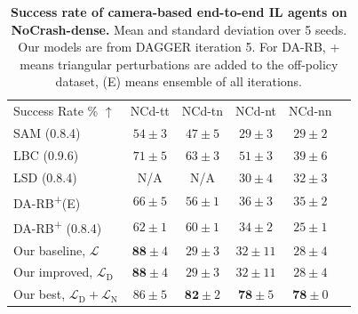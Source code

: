 \begin{table}
	\setlength{\tabcolsep}{2.67pt}
	\centering
	\begin{tabular}{lccccc}
		\toprule
		Success Rate \% $\uparrow$
		&  NCd-tt & NCd-tn  & NCd-nt & NCd-nn  \\ 
		\cmidrule(lr){1-1}\cmidrule(lr){2-5}
		SAM \cite{zhao2021sam} (0.8.4) & 
		$54 \pm 3$ & $47 \pm 5$ & $29 \pm 3$ & $29 \pm 2$ \\
		LBC \cite{chen2020learning} (0.9.6) & 
		$71 \pm 5$ & $63 \pm 3$ & $51 \pm 3$ & $39 \pm 6$ \\
		LSD \cite{ohn2020learning} (0.8.4) & 
		N/A & N/A & $30 \pm 4$ & $32 \pm 3$ \\
		DA-RB\textsuperscript{+}(E) \cite{prakash2020exploring} & 
		$66 \pm 5$ & $56 \pm 1$ & $36 \pm 3$ & $35 \pm 2$ \\
		DA-RB\textsuperscript{+} \cite{prakash2020exploring} (0.8.4)  & 
		$62 \pm 1$ & $60 \pm 1$ & $34 \pm 2$ & $25 \pm 1$ \\
		Our baseline, $\mathcal{L}$ & 
		$\mathbf{88} \pm 4$ & $29 \pm 3$ & $32 \pm 11$ & $28 \pm 4$ \\
		Our improved, $\mathcal{L}_\text{D} $ & 
		$\mathbf{88} \pm 4$ & $29 \pm 3$ & $32 \pm 11$ & $28 \pm 4$ \\
		Our best, $\mathcal{L}_\text{D}+\mathcal{L}_\text{N}$ & 
		$86 \pm 5$ & $\mathbf{82} \pm 2$ & $\mathbf{78} \pm 5$ & $\mathbf{78} \pm 0$ \\
		\bottomrule
	\end{tabular}
	\vspace{-1ex}
	\caption{\textbf{Success rate of camera-based end-to-end IL agents on NoCrash-dense.}
		Mean and standard deviation over 5 seeds. 
		Our models are from DAGGER iteration 5. 
		For DA-RB, + means triangular perturbations are added to the off-policy dataset, (E) means ensemble of all iterations.}
	\label{table:sucess_rate_nc_dense}
	\vspace{-2ex}
\end{table}

